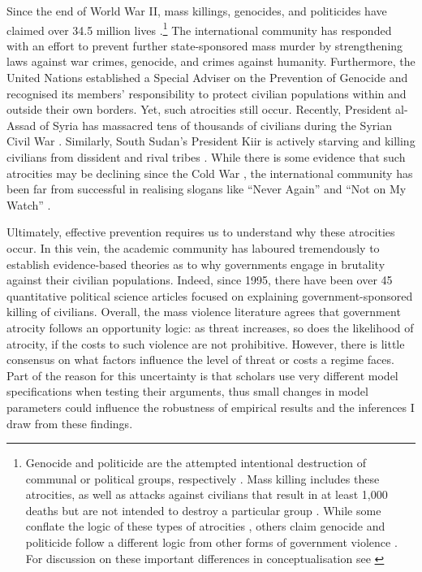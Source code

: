 \documentclass[a4paper,12pt]{article}
\begin{document}
Since the end of World War II, mass killings, genocides, and politicides have claimed over 34.5 million lives \citep{marshall2017pitf}.\footnote{Genocide and politicide are the attempted intentional destruction of communal or political groups, respectively \citep[see][]{harff1988toward}. Mass killing includes these atrocities, as well as attacks against civilians that result in at least 1,000 deaths but are not intended to destroy a particular group \citep[see][]{ulfelder2008assessing}. While some conflate the logic of these types of atrocities \citep[e.g.,][]{rummel1995democracy, valentino2004draining}, others claim genocide and politicide follow a different logic from other forms of government violence \citep{kalyvas2006logic,stanton2015regulating}. For discussion on these important differences in conceptualisation see \citep[]{straus2007second, finkel2012macro}} The international community has responded with an effort to prevent further state-sponsored mass murder by strengthening laws against war crimes, genocide, and crimes against humanity. Furthermore, the United Nations established a Special Adviser on the Prevention of Genocide and recognised its members' responsibility to protect civilian populations within and outside their own borders. Yet, such atrocities still occur. Recently, President al-Assad of Syria has massacred tens of thousands of civilians during the Syrian Civil War \citep{goldman2017nyt}. Similarly, South Sudan's President Kiir is actively starving and killing civilians from dissident and rival tribes \citep{nichols2017reuters}. While there is some evidence that such atrocities may be declining since the Cold War \citep{valentino2014we}, the international community has been far from successful in realising slogans like ``Never Again'' and ``Not on My Watch'' \citep{cheadle2007not}.
	
Ultimately, effective prevention requires us to understand why these atrocities occur. In this vein, the academic community has laboured tremendously to establish evidence-based theories as to why governments engage in brutality against their civilian populations. Indeed, since 1995, there have been over 45 quantitative political science articles focused on explaining government-sponsored killing of civilians. Overall, the mass violence literature agrees that government atrocity follows an opportunity logic: as threat increases, so does the likelihood of atrocity, if the costs to such violence are not prohibitive. However, there is little consensus on what factors influence the level of threat or costs a regime faces. Part of the reason for this uncertainty is that scholars use very different model specifications when testing their arguments, thus small changes in model parameters could influence the robustness of empirical results and the inferences I draw from these findings.
	
\end{document}
